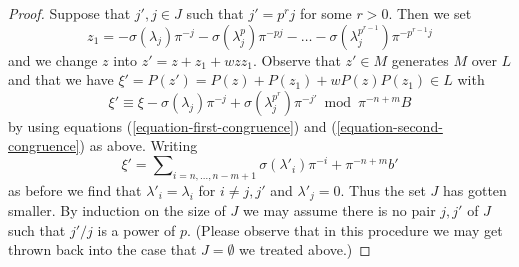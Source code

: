 \documentclass[10pt,a4paper]{amsart}
\theoremstyle{plain}
\theoremstyle{definition}
\theoremstyle{remark}
\numberwithin{equation}{subsection}
\begin{document}
\begin{proof}
\medskip\noindent
Suppose that $j', j \in J$ such that $j' = p^r j$ for some $r > 0$.
Then we set
$$
z_1 = - \sigma(\lambda_j) \pi^{-j} - \sigma(\lambda_j^p) \pi^{-pj} -
\ldots - \sigma(\lambda_j^{p^{r - 1}}) \pi^{-p^{r - 1}j}
$$
and we change $z$ into $z' = z + z_1 + wzz_1$. Observe that $z' \in M$
generates $M$ over $L$ and that we have
$\xi' = P(z') = P(z) + P(z_1) + wP(z)P(z_1) \in L$ with
$$
\xi' \equiv
\xi - \sigma(\lambda_j) \pi^{-j} + \sigma(\lambda_j^{p^r}) \pi^{-j'}
\bmod \pi^{-n + m}B
$$
by using equations (\ref{equation-first-congruence}) and
(\ref{equation-second-congruence}) as above. Writing
$$
\xi' = \sum\nolimits_{i = n, \ldots, n - m + 1} \sigma(\lambda'_i) \pi^{-i}
+ \pi^{-n + m}b'
$$
as before we find that
$\lambda'_i = \lambda_i$ for $i \not = j, j'$ and $\lambda'_j = 0$.
Thus the set $J$ has gotten smaller.
By induction on the size of $J$ we may assume there is no pair
$j, j'$ of $J$ such that $j'/j$ is a power of $p$.
(Please observe that in this procedure we may get thrown back into the case
that $J = \emptyset$ we treated above.)


\end{proof}
\end{document}

